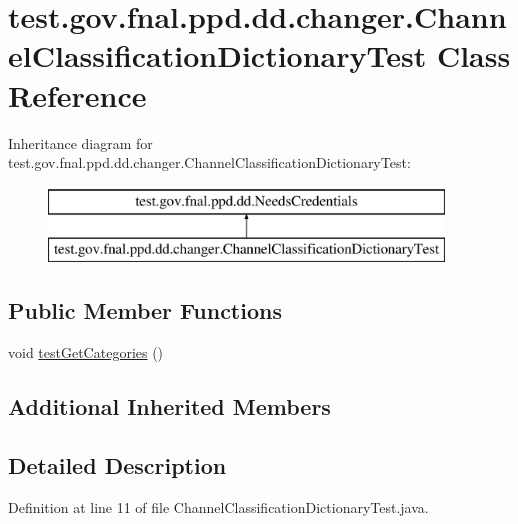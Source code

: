 \hypertarget{classtest_1_1gov_1_1fnal_1_1ppd_1_1dd_1_1changer_1_1ChannelClassificationDictionaryTest}{\section{test.\-gov.\-fnal.\-ppd.\-dd.\-changer.\-Channel\-Classification\-Dictionary\-Test Class Reference}
\label{classtest_1_1gov_1_1fnal_1_1ppd_1_1dd_1_1changer_1_1ChannelClassificationDictionaryTest}
}
Inheritance diagram for test.\-gov.\-fnal.\-ppd.\-dd.\-changer.\-Channel\-Classification\-Dictionary\-Test\-:\begin{figure}[H]
\begin{center}
\leavevmode
\includegraphics[height=2.000000cm]{classtest_1_1gov_1_1fnal_1_1ppd_1_1dd_1_1changer_1_1ChannelClassificationDictionaryTest}
\end{center}
\end{figure}
\subsection*{Public Member Functions}
\begin{DoxyCompactItemize}
\item 
void \hyperlink{classtest_1_1gov_1_1fnal_1_1ppd_1_1dd_1_1changer_1_1ChannelClassificationDictionaryTest_a2c3396f83d17d27a31eefad2160e8686}{test\-Get\-Categories} ()
\end{DoxyCompactItemize}
\subsection*{Additional Inherited Members}


\subsection{Detailed Description}


Definition at line 11 of file Channel\-Classification\-Dictionary\-Test.\-java.




